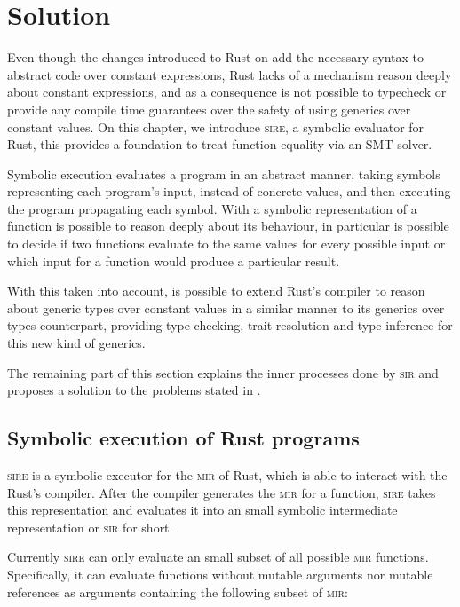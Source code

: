 \chapter{Solution}
\label{chap:solution}

Even though the changes introduced to Rust on  add the
necessary syntax to abstract code over constant expressions, Rust lacks of a
mechanism reason deeply about constant expressions, and as a consequence is not
possible to typecheck or provide any compile time guarantees over the safety of
using generics over constant values.  On this chapter, we introduce
\textsc{sire}, a symbolic evaluator for Rust, this provides a foundation to
treat function equality via an SMT solver. 

Symbolic execution evaluates a program in an abstract manner, taking symbols
representing each program's input, instead of concrete values, and then
executing the program propagating each symbol. With a symbolic representation
of a function is possible to reason deeply about its behaviour, in particular
is possible to decide if two functions evaluate to the same values for every
possible input or which input for a function would produce a particular result.

With this taken into account, is possible to extend Rust's compiler to reason
about generic types over constant values in a similar manner to its generics
over types counterpart, providing type checking, trait resolution and type
inference for this new kind of generics.

The remaining part of this section explains the inner processes done by
\textsc{sir} and proposes a solution to the problems stated in
.

\section{Symbolic execution of Rust programs}
\label{sec:symbolic_execution}

\textsc{sire} is a symbolic executor for the \textsc{mir} of Rust, which is
able to interact with the Rust's compiler. After the compiler generates the
\textsc{mir} for a function, \textsc{sire} takes this representation and
evaluates it into an small symbolic intermediate representation or \textsc{sir}
for short.

Currently \textsc{sire} can only evaluate an small subset of all possible
\textsc{mir} functions. Specifically, it can evaluate functions without mutable
arguments nor mutable references as arguments containing the following subset
of \textsc{mir}:

